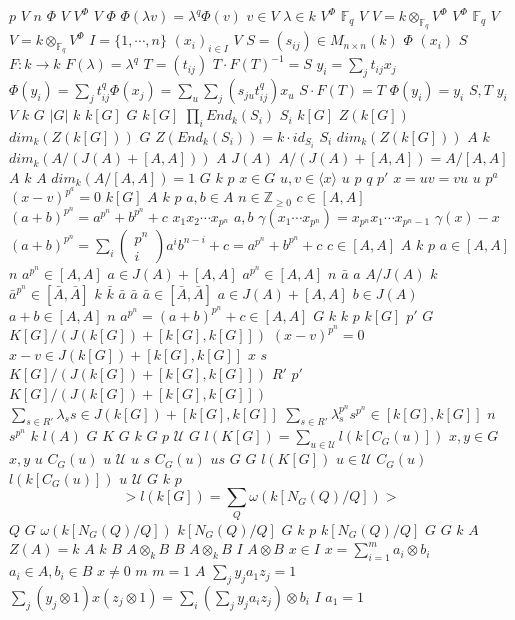 \documentclass{article}
\begin{document}
$p$
$V$
$n$
$\Phi$
$V$
$V^\Phi$
$V$
$\Phi$
$\Phi(\lambda v)=\lambda^q\Phi(v)$
$v \in V$
$\lambda \in k$
$V^\Phi$
$\mathbb{F}_q$
$V$
$V=k \otimes_{\mathbb{F}_q} V^\Phi$
$V^\Phi$
$\mathbb{F}_q$
$V$
$V=k\otimes_{\mathbb{F}_q} V^\Phi$
$I=\{1,\cdots,n\}$
$(x_i)_{i \in I}$
$V$
$S=(s_{ij}) \in M_{n \times n}(k)$
$\Phi$
$(x_i)$
$S$
$F:k \rightarrow k$
$F(\lambda)=\lambda^q$
$T=(t_{ij})$
$T\cdot F(T)^{-1}=S$
$y_i=\sum_{j}t_{ij}x_j$
$\Phi(y_i)=\sum_jt_{ij}^q\Phi(x_j)=\sum_u\sum_j(s_{ju}t_{ij}^q)x_u$
$S \cdot F(T)=T$
$\Phi(y_i)=y_i$
$S,T$
$y_i$
$V$
$k$
$G$
$|G|$
$k$
$k[G]$
$G$
$k[G]$
$\prod_iEnd_k(S_i)$
$S_i$
$k[G]$
$Z(k[G])$
$dim_k(Z(k[G]))$
$G$
$Z(End_k(S_i))=k \cdot id_{S_i}$
$S_i$
$dim_k(Z(k[G]))$
$A$
$k$
$dim_k(A/(J(A)+[A,A]))$
$A$
$J(A)$
$A/(J(A)+[A,A])=A/[A,A]$
$A$
$k$
$A$
$dim_k(A/[A,A])=1$
$G$
$k$
$p$
$x \in G$
$u,v \in \langle x \rangle$
$u$
$p$
$q$
$p'$
$x=uv=vu$
$u$
$p^a$
$(x-v)^{p^a}=0$
$k[G]$
$A$
$k$
$p$
$a,b \in A$
$n \in \mathbb{Z}_{\geq 0}$
$c \in [A,A]$
$(a+b)^{p^n}=a^{p^n}+b^{p^n}+c$
$x_1x_2\cdots x_{p^n}$
$a,b$
$\gamma(x_1\cdots x_{p^n})=x_{p^n}x_1\cdots x_{p^n-1}$
$\gamma(x)-x$
$(a+b)^{p^n}=\sum_i \begin{pmatrix}p^n\\ i\end{pmatrix}a^ib^{n-i}+c=a^{p^n}+b^{p^n}+c$
$c \in [A,A]$
$A$
$k$
$p$
$a \in [A,A]$
$n$
$a^{p^n} \in [A,A]$
$a \in J(A)+[A,A]$
$a^{p^n} \in [A,A]$
$n$
$\bar{a}$
$a$
$A/J(A)$
$k$
$\bar{a}^{p^n} \in [\bar{A},\bar{A}]$
$k$
$\bar{k}$
$\bar{a}$
$\bar{a}$
$\bar{a} \in [\bar{A},\bar{A}]$
$a \in J(A)+[A,A]$
$b \in J(A)$
$a+b \in [A,A]$
$n$
$a^{p^n}=(a+b)^{p^n}+c \in [A,A]$
$G$
$k$
$k$
$p$
$k[G]$
$p'$
$G$
$K[G]/(J(k[G])+[k[G],k[G]])$
$(x-v)^{p^n}=0$
$x-v \in J(k[G])+[k[G],k[G]]$
$x$
$s$
$K[G]/(J(k[G])+[k[G],k[G]])$
$R'$
$p'$
$K[G]/(J(k[G])+[k[G],k[G]])$
$\sum_{s \in R'} \lambda_ss \in J(k[G])+[k[G],k[G]]$
$\sum_{s \in R'} \lambda_s^{p^n}s^{p^n} \in [k[G],k[G]]$
$n$
$s^{p^n}$
$k$
$l(A)$
$G$
$K$
$G$
$k$
$G$
$p$
$\mathcal{U}$
$G$
$l(K[G])=\sum_{u \in \mathcal{U}}l(k[C_G(u)])$
$x,y \in G$
$x,y$
$u$
$C_G(u)$
$u$
$\mathcal{U}$
$u$
$s$
$C_G(u)$
$us$
$G$
$G$
$l(K[G])$
$u \in \mathcal{U}$
$C_G(u)$
$l(k[C_G(u)])$
$u$
$\mathcal{U}$
$G$
$k$
$p$
$$
> l(k[G])=\sum_Q\omega(k[N_G(Q)/Q])
> $$
$Q$
$G$
$\omega(k[N_G(Q)/Q])$
$k[N_G(Q)/Q]$
$G$
$k$
$p$
$k[N_G(Q)/Q]$
$G$
$G$
$k$
$A$
$Z(A)=k$
$A$
$k$
$B$
$A \otimes_kB$
$B$
$A \otimes_kB$
$I$
$A \otimes B$
$x \in I$
$x=\sum_{i=1}^m a_i \otimes b_i$
$a_i \in A,b_i \in B$
$x \neq 0$
$m$
$m=1$
$A$
$\sum_jy_ja_1z_j=1$
$\sum_j(y_j \otimes 1)x(z_j \otimes 1)=\sum_i(\sum_jy_ja_iz_j) \otimes b_i$
$I$
$a_1=1$
\end{document}
